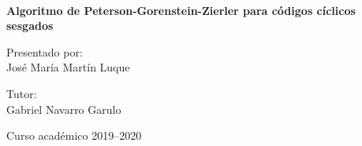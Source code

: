 \begin{titlepage}
  \AddToShipoutPicture*{\BackgroundPic}

  \begin{addmargin}[2.56cm]{0cm}
  \begin{flushleft}
    \Large
    \hfill\vfil

    \vfill\vfill

    \vspace{4cm}

    {}\\[2cm]\vfill



    \begingroup
    \LARGE{\bfseries Algoritmo de Peterson-Gorenstein-Zierler para códigos cíclicos sesgados} \\ \bigskip
    \endgroup

    \vfill\vfill\vfill\vfill

    \large{Presentado por:}\\
    \large{José María Martín Luque}

    \vspace*{0.4cm}

    \large{Tutor:}\\
    \large{Gabriel Navarro Garulo}

    \vfill
    Curso académico 2019--2020
  \end{flushleft}
  \end{addmargin}

\end{titlepage}